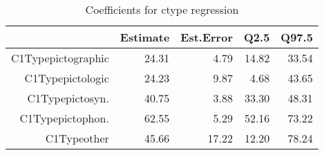\begin{table}[ht]
\centering
\begin{tabular}{rrrrr}
  \hline
 & Estimate & Est.Error & Q2.5 & Q97.5 \\ 
  \hline
C1Typepictographic & 24.31 & 4.79 & 14.82 & 33.54 \\ 
  C1Typepictologic & 24.23 & 9.87 & 4.68 & 43.65 \\ 
  C1Typepictosyn. & 40.75 & 3.88 & 33.30 & 48.31 \\ 
  C1Typepictophon. & 62.55 & 5.29 & 52.16 & 73.22 \\ 
  C1Typeother & 45.66 & 17.22 & 12.20 & 78.24 \\ 
   \hline
\end{tabular}
\caption{Coefficients for ctype regression} 
\end{table}
